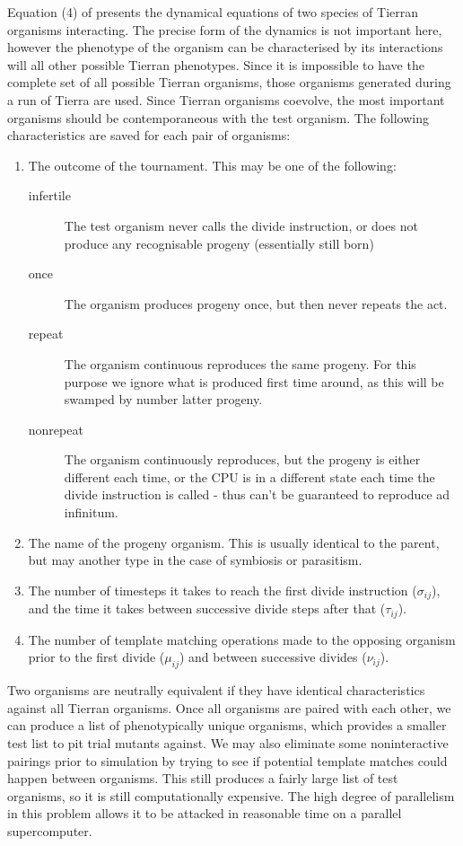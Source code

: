 Equation (4) of \cite{Standish97b} presents the dynamical equations of
two species of Tierran organisms interacting. The precise form of the
dynamics is not important here, however the phenotype of the organism
can be characterised by its interactions will all other possible Tierran
phenotypes. Since it is impossible to have the complete set of all
possible Tierran organisms, those organisms generated during a run of
Tierra are used. Since Tierran organisms coevolve, the most important
organisms should be contemporaneous with the test organism. The
following characteristics are saved for each pair of organisms:
\begin{enumerate}
\item The outcome of the tournament. This may be one of the following:
\begin{description}
\item[infertile] The test organism never calls the divide instruction,
or does not produce any recognisable progeny (essentially still born)
\item[once] The organism produces progeny once, but then never repeats
the act.
\item[repeat] The organism continuous reproduces the same progeny. For
this purpose we ignore what is produced first time around, as this
will be swamped by number latter progeny.
\item[nonrepeat] The organism continuously reproduces, but the progeny
is either different each time, or the CPU is in a different state each
time the divide instruction is called - thus can't be guaranteed to
reproduce ad infinitum.
\end{description}

\item The name of the progeny organism. This is usually identical to
the parent, but may another type in the case of symbiosis or
parasitism.

\item The number of timesteps it takes to reach the first divide
instruction ($\sigma_{ij}$), and the time it takes between successive
divide steps after that ($\tau_{ij}$).

\item The number of template matching operations made to the opposing
organism prior to the first divide ($\mu_{ij}$) and between successive
divides ($\nu_{ij}$).
\end{enumerate}

Two organisms are neutrally equivalent if they have identical
characteristics against all Tierran organisms. Once all organisms are
paired with each other, we can produce a list of phenotypically unique
organisms, which provides a smaller test list to pit trial mutants
against. We may also eliminate some noninteractive pairings prior to
simulation by trying to see if potential template matches could happen
between organisms. This still produces a fairly large list of test
organisms, so it is still computationally expensive. The high degree
of parallelism in this problem allows it to be attacked in reasonable
time on a parallel supercomputer.

